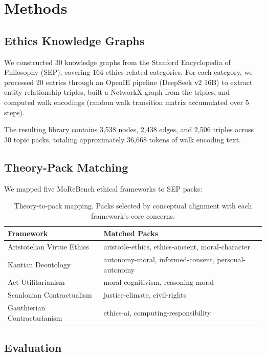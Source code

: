\documentclass[11pt,a4paper]{article}
\begin{document}
\section{Methods}

\subsection{Ethics Knowledge Graphs}

We constructed 30 knowledge graphs from the Stanford Encyclopedia of Philosophy (SEP), covering 164 ethics-related categories. For each category, we processed 20 entries through an OpenIE pipeline (DeepSeek v2 16B) to extract entity-relationship triples, built a NetworkX graph from the triples, and computed walk encodings (random walk transition matrix accumulated over 5 steps).

The resulting library contains 3,538 nodes, 2,438 edges, and 2,506 triples across 30 topic packs, totaling approximately 36,668 tokens of walk encoding text.

\subsection{Theory-Pack Matching}

We mapped five MoReBench ethical frameworks to SEP packs:

\begin{table}[h]
\centering
\begin{tabular}{ll}
\toprule
\textbf{Framework} & \textbf{Matched Packs} \\
\midrule
Aristotelian Virtue Ethics & aristotle-ethics, ethics-ancient, moral-character \\
Kantian Deontology & autonomy-moral, informed-consent, personal-autonomy \\
Act Utilitarianism & moral-cognitivism, reasoning-moral \\
Scanlonian Contractualism & justice-climate, civil-rights \\
Gauthierian Contractarianism & ethics-ai, computing-responsibility \\
\bottomrule
\end{tabular}
\caption{Theory-to-pack mapping. Packs selected by conceptual alignment with each framework's core concerns.}
\label{tab:mapping}
\end{table}

\subsection{Evaluation}
\end{document}
